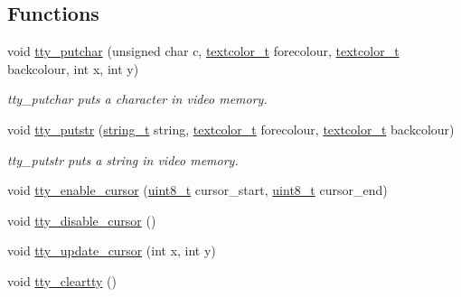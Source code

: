 \subsection*{Functions}
\begin{DoxyCompactItemize}
\item 
void \hyperlink{a00035_a6b2eb1229867539fdce8bfbd8fa47759_a6b2eb1229867539fdce8bfbd8fa47759}{tty\+\_\+putchar} (unsigned char c, \hyperlink{a00044_a69d534d923d28a9c06b33b5a2a83bf9e_a69d534d923d28a9c06b33b5a2a83bf9e}{textcolor\+\_\+t} forecolour, \hyperlink{a00044_a69d534d923d28a9c06b33b5a2a83bf9e_a69d534d923d28a9c06b33b5a2a83bf9e}{textcolor\+\_\+t} backcolour, int x, int y)
\begin{DoxyCompactList}\small\item\em tty\+\_\+putchar puts a character in video memory. \end{DoxyCompactList}\item 
void \hyperlink{a00035_a6da4674dd5a33a04c76d83243c8e4b8e_a6da4674dd5a33a04c76d83243c8e4b8e}{tty\+\_\+putstr} (\hyperlink{a00029_ada436671bc57dfd805a9f3974c81e618_ada436671bc57dfd805a9f3974c81e618}{string\+\_\+t} string, \hyperlink{a00044_a69d534d923d28a9c06b33b5a2a83bf9e_a69d534d923d28a9c06b33b5a2a83bf9e}{textcolor\+\_\+t} forecolour, \hyperlink{a00044_a69d534d923d28a9c06b33b5a2a83bf9e_a69d534d923d28a9c06b33b5a2a83bf9e}{textcolor\+\_\+t} backcolour)
\begin{DoxyCompactList}\small\item\em tty\+\_\+putstr puts a string in video memory. \end{DoxyCompactList}\item 
void \hyperlink{a00035_a29a519c68d5fda10f6ca3aeaead74347_a29a519c68d5fda10f6ca3aeaead74347}{tty\+\_\+enable\+\_\+cursor} (\hyperlink{a00038_aba7bc1797add20fe3efdf37ced1182c5_aba7bc1797add20fe3efdf37ced1182c5}{uint8\+\_\+t} cursor\+\_\+start, \hyperlink{a00038_aba7bc1797add20fe3efdf37ced1182c5_aba7bc1797add20fe3efdf37ced1182c5}{uint8\+\_\+t} cursor\+\_\+end)
\item 
void \hyperlink{a00035_a78c20225f9289b7e20cce21257ce8dca_a78c20225f9289b7e20cce21257ce8dca}{tty\+\_\+disable\+\_\+cursor} ()
\item 
void \hyperlink{a00035_a9ae91144ad89af8b8af856b611218d0c_a9ae91144ad89af8b8af856b611218d0c}{tty\+\_\+update\+\_\+cursor} (int x, int y)
\item 
void \hyperlink{a00035_a5d3d15fdf823500b88f9a02c8e8c7682_a5d3d15fdf823500b88f9a02c8e8c7682}{tty\+\_\+cleartty} ()
\item 

\end{DoxyCompactItemize}
